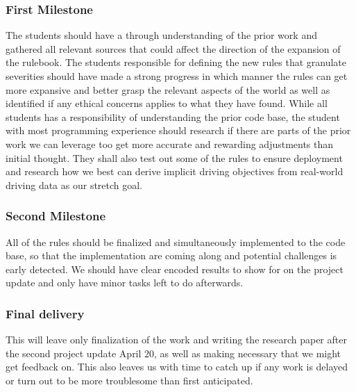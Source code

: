 \documentclass[conference]{IEEEtran}
\begin{document}
\subsubsection{First Milestone}
The students should have a through understanding of the prior work and gathered all relevant sources that could affect the direction of the expansion of the rulebook. The students responsible for defining the new rules that granulate severities should have made a strong progress in which manner the rules can get more expansive and better grasp the relevant aspects of the world as well as identified if any ethical concerns applies to what they have found. While all students has a responsibility of understanding the prior code base, the student with most programming experience should research if there are parts of the prior work we can leverage too get more accurate and rewarding adjustments than initial thought. They shall also test out some of the rules to ensure deployment and research how we best can derive implicit driving objectives from real-world driving data as our stretch goal.

\subsubsection{Second Milestone}
All of the rules should be finalized and simultaneously implemented to the code base, so that the implementation are coming along and potential challenges is early detected. We should have clear encoded results to show for on the project update and only have minor tasks left to do afterwards. 

\subsubsection{Final delivery}
This will leave only finalization of the work and writing the research paper after the second project update April 20, as well as making necessary that we might get feedback on. This also leaves us with time to catch up if any work is delayed or turn out to be more troublesome than first anticipated.




\end{document}
